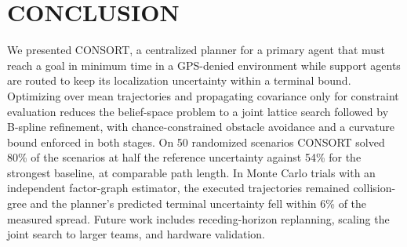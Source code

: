 \documentclass[letterpaper, 10 pt, conference]{ieeeconf}
\theoremstyle{remark}
\begin{document}
\section{CONCLUSION}
We presented CONSORT, a centralized planner for a primary agent that must reach a
goal in minimum time in a GPS-denied environment while support agents are
routed to keep its localization uncertainty within a terminal bound.
Optimizing over mean trajectories and propagating covariance only for
constraint evaluation reduces the belief-space problem to a joint lattice
search followed by B-spline refinement, with chance-constrained obstacle
avoidance and a curvature bound enforced in both stages. On 50 randomized
scenarios CONSORT solved 80\% of the scenarios at half the reference
uncertainty against 54\% for the strongest baseline, at comparable path length. In Monte
Carlo trials with an independent factor-graph estimator, the executed trajectories remained collision-gree and the planner's predicted terminal uncertainty fell within 6\% of the measured spread. Future work includes receding-horizon replanning,
scaling the joint search to larger teams, and hardware validation.



\end{document}

